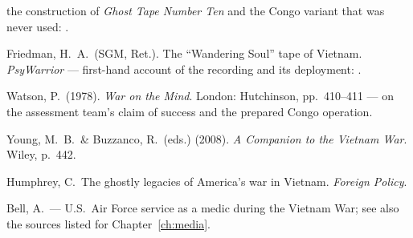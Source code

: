 \begin{srcnotes}
the construction of \emph{Ghost Tape Number Ten} and the Congo variant that was never used:
.
\item Friedman, H.\ A.\ (SGM, Ret.). The ``Wandering Soul'' tape of Vietnam. \emph{PsyWarrior} ---
first-hand account of the recording and its deployment:
.
\item Watson, P.\ (1978). \emph{War on the Mind}. London: Hutchinson, pp.\ 410--411 --- on the
assessment team's claim of success and the prepared Congo operation.
\item Young, M.\ B.\ \& Buzzanco, R.\ (eds.) (2008). \emph{A Companion to the Vietnam War}.
Wiley, p.\ 442.
\item Humphrey, C.\ The ghostly legacies of America's war in Vietnam. \emph{Foreign Policy}.
\item Bell, A.\ --- U.S.\ Air Force service as a medic during the Vietnam War; see also the sources
listed for Chapter~\ref{ch:media}.
\end{srcnotes}
